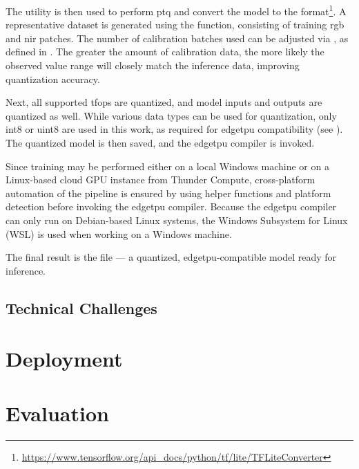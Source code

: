 {The  utility is then used to perform \gls{ptq} and convert the model to
the  format\footnote{\url{https://www.tensorflow.org/api_docs/python/tf/lite/TFLiteConverter}}.
A representative dataset is generated using the  function, consisting of training \gls{rgb} and \gls{nir} patches.
The number of calibration batches used can be adjusted via , as defined in .
The greater the amount of calibration data, the more likely the observed value range will closely match the inference data, improving quantization accuracy.

Next, all supported \glspl{tfop} are quantized, and model inputs and outputs are quantized as well.
While various data types can be used for quantization, only \gls{int8} or \gls{uint8} are used in this work, as required for \gls{edgetpu} compatibility (see ).
The quantized model is then saved, and the \gls{edgetpu} compiler is invoked.

Since training may be performed either on a local Windows machine or on a Linux-based cloud GPU instance from Thunder Compute,
cross-platform automation of the pipeline is ensured by using helper functions and platform detection before invoking the \gls{edgetpu} compiler.
Because the \gls{edgetpu} compiler can only run on Debian-based Linux systems, the Windows Subsystem for Linux (WSL) is used when working on a Windows machine.

The final result is the  file --- a quantized, \gls{edgetpu}-compatible model ready for inference.

\subsection*{Technical Challenges}




\section{Deployment}
\label{sec:deployment}

\section{Evaluation}


}
